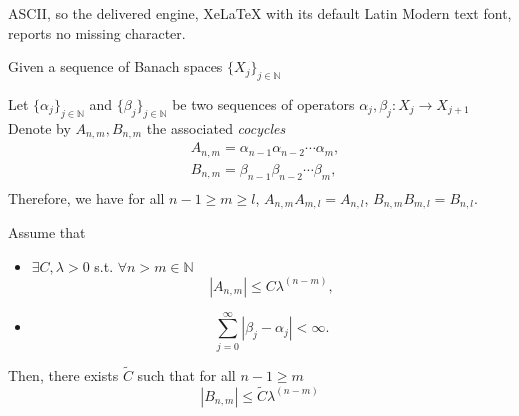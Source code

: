 \documentclass[10pt,a4paper]{amsart}
\begin{document}
ASCII, so the delivered engine, XeLaTeX with its default Latin Modern text font, reports no missing character.
\begin{prop}\label{ratesmatrices}
  Given a sequence of Banach spaces $\{ X_j\}_{j \in \mathbb{N}}$

  Let $\{\alpha_j\}_{j \in \mathbb{N}}$ and
   $\{\beta_j\}_{j \in \mathbb{N}}$
  be two sequences of operators
  $\alpha_j, \beta_j: X_j \rightarrow X_{j+1}$
  Denote by $A_{n,m}, B_{n,m}$ the associated \emph{cocycles}
  \begin{equation}\label{cocycle}
    \begin{split}
      &A_{n,m} = \alpha_{n-1} \alpha_{n-2} \cdots \alpha_m , \\
      &B_{n,m} = \beta_{n-1} \beta_{n-2} \cdots \beta_m , \\
      \end{split}
  \end{equation}
  Therefore, we have for all $n -1\ge m \ge l$, $A_{n,m} A_{m,l} = A_{n,l}$,
  $B_{n,m} B_{m,l} = B_{n,l}$.

  Assume that
  \begin{itemize}
  \item[(i)] $ \exists C, \lambda  > 0 $ s.t. $\forall n> m \in \mathbb{N}$
    \[
    |A_{n,m} |  \le C \lambda^{(n-m)},
    \]
  \item[(ii)]
    \[
    \sum_{j=0}^{\infty} | \beta_j - \alpha_j | < \infty .
    \]
  \end{itemize}

  Then, there exists $ \tilde C$ such that  for all $n -1\ge m$
    \[
    |B_{n,m} |  \le \tilde C \lambda^{(n-m)}
    \]
  \end{prop}
\end{document}
